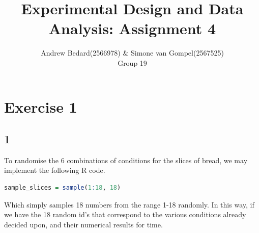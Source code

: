 \documentclass{article}
\title{Experimental Design and Data Analysis: Assignment 4}
\author{Andrew Bedard(2566978) \& Simone van Gompel(2567525) \\ Group 19}
\begin{document}
  \maketitle

  \section*{Exercise 1}
    \subsection*{1}
    To randomise the 6 combinations of conditions for the slices of bread, we may implement the following R code.
      \begin{lstlisting}[language=R]
      sample_slices = sample(1:18, 18)
      \end{lstlisting}
Which simply samples 18 numbers from the range 1-18 randomly. In this way, if we have the 18 random id's that correspond to the various conditions already decided upon, and their numerical results for time.
\end{document}
